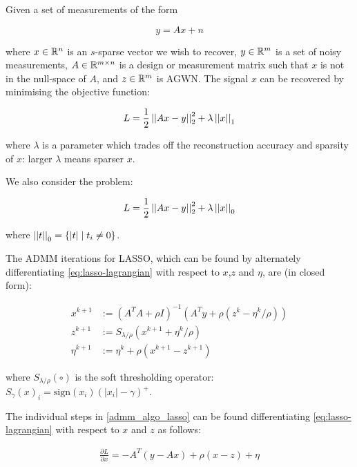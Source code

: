 \begin{example}[LASSO]
Given a set of measurements of the form

\begin{equation}
y = Ax + n 
\end{equation}

where \(x \in {\mathbb{R}}^n\) is an \(s\)-sparse vector we wish to recover, \(y \in {\mathbb{R}}^m\) is a set of noisy measurements, \(A \in {\mathbb{R}}^{m \times n}\) is a design or measurement matrix such that \(x\) is not in the null-space of \(A\), and \(z \in {\mathbb{R}}^m\) is AGWN. The signal \(x\) can be recovered by  minimising the objective function:

\begin{equation}
L = \frac{1}{2} \left|\left|Ax-y\right|\right|_2^2 + \lambda\left|\left|x\right|\right|_1
\label{LASSO}
\end{equation}

where \(\lambda\) is a parameter which trades off the reconstruction accuracy and sparsity of \(x\): larger \(\lambda\) means sparser \(x\). 

We also consider the problem:

\begin{equation}
L = \frac{1}{2} \left|\left|Ax-y\right|\right|_2^2 + \lambda\left|\left|x\right|\right|_0
\label{LASSO-L0}
\end{equation}

where \( \left|\left|t\right|\right|_0 = \{ |t| \mid t_i \neq 0 \} \).

The ADMM iterations for LASSO, which can be found by alternately differentiating \eqref{eq:lasso-lagrangian} with respect to \(x\),\(z\) and \(\eta\), are (in closed form):

\begin{align}
x^{k+1} &:= \left(A^TA + \rho I\right)^{-1}\left(A^Ty +\rho\left( z^k - \eta^k/\rho\right)\right)\\
z^{k+1} &:= S_{\lambda/\rho}\left(x^{k+1} + \eta^k/\rho\right)
 \\
\eta^{k+1} &:= \eta^{k} + \rho\left(x^{k+1}-z^{k+1}\right)
\label{admm_algo_lasso}
\end{align}

where \(S_{\lambda/\rho}\left(\circ\right)\) is the soft thresholding operator: \(S_\gamma\left(x\right)_i = \mathrm{sign}(x_i)\left(|x_i| - \gamma\right)^+\).

The individual steps in \eqref{admm_algo_lasso} can be found differentiating \eqref{eq:lasso-lagrangian} with respect to \(x\) and \(z\) as follows:

\begin{align*}
\frac{\partial L}{\partial x } = -A^T\left(y-Ax\right) + \rho (x-z) + \eta
\end{align*}


\end{example}
